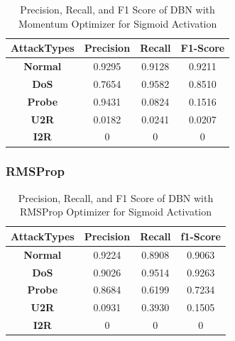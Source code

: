 \documentclass[12pt, a4paper]{report}
\begin{document}
\begin{table}[ht]
\centering
\captionsetup{justification=centering,margin=2cm}
\begin{tabular}{|c|c|c|c|}
\hline
\textbf{AttackTypes} & \multicolumn{1}{c|}{\textbf{Precision}} & \multicolumn{1}{c|}{\textbf{Recall}} & \multicolumn{1}{c|}{\textbf{F1-Score}} \\ \hline
\textbf{Normal}      & 0.9295                                   & 0.9128                                & 0.9211                                  \\ \hline
\textbf{DoS}         &0.7654                                   & 0.9582                                & 0.8510                                  \\ \hline
\textbf{Probe}       & 0.9431                                   & 0.0824                                & 0.1516                                  \\ \hline
\textbf{U2R}         &0.0182                                   & 0.0241                                & 0.0207                                  \\ \hline
\textbf{I2R}         & 0                                       & 0                                    & 0                                      \\ \hline
\end{tabular}
\caption{Precision, Recall, and F1 Score of DBN with Momentum Optimizer for Sigmoid Activation}
\label{prf1_mom_dbn}
\end{table}
\clearpage
\subsubsection{RMSProp}
\begin{table}[ht]
\centering
\captionsetup{justification=centering,margin=2cm}
\begin{tabular}{|c|c|c|c|}
\hline
\textbf{AttackTypes} & \multicolumn{1}{c|}{\textbf{Precision}} & \multicolumn{1}{c|}{\textbf{Recall}} & \multicolumn{1}{c|}{\textbf{f1-Score}} \\ \hline
\textbf{Normal}      & 0.9224                                  & 0.8908                               & 0.9063                                 \\ \hline
\textbf{DoS}         & 0.9026                                  & 0.9514                               & 0.9263                                 \\ \hline
\textbf{Probe}       & 0.8684                                  & 0.6199                               & 0.7234                                 \\ \hline
\textbf{U2R}         & 0.0931                                  & 0.3930                               & 0.1505                                 \\ \hline
\textbf{I2R}         & 0                                       & 0                                    & 0                                      \\ \hline
\end{tabular}
\caption{Precision, Recall, and F1 Score of DBN with RMSProp Optimizer for Sigmoid Activation}
\label{prf1_rms_dbn}
\end{table}
\end{document}
